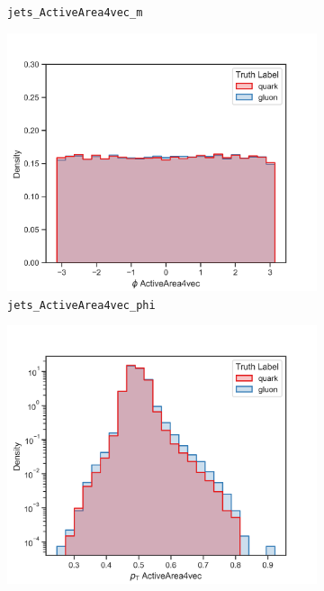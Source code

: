 \begin{figure}[!htb]
\begin{subfigure}[t]{0.48\textwidth}
		\caption{\texttt{jets\_ActiveArea4vec\_m}}
		\label{fig:highlevel_1}
	\end{subfigure}
	\begin{subfigure}[t]{0.48\textwidth}
		\includegraphics[width=1\textwidth]{src/plots/distributions/highlevel/jets_ActiveArea4vec_phi.png}
		\caption{\texttt{jets\_ActiveArea4vec\_phi}}
		\label{fig:highlevel_2}
	\end{subfigure}
	\begin{subfigure}[t]{0.48\textwidth}
		\includegraphics[width=1\textwidth]{src/plots/distributions/highlevel/jets_ActiveArea4vec_pt.png}

\end{subfigure}
\end{figure}
